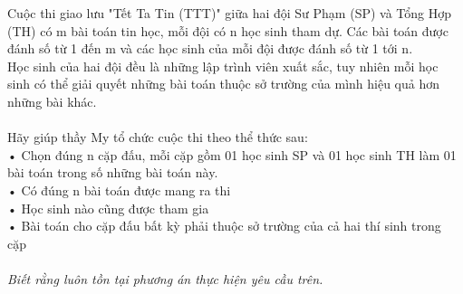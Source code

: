 Cuộc thi giao lưu "Tết Ta Tin (TTT)" giữa hai đội Sư Phạm (SP) và Tổng Hợp (TH) có m bài toán tin học, mỗi đội có n học sinh tham dự. Các bài toán được đánh số từ 1 đến m và các học sinh của mỗi đội được đánh số từ 1 tới n.   
\\   Học sinh của hai đội đều là những lập trình viên xuất sắc, tuy nhiên mỗi học sinh có thể giải quyết những bài toán thuộc sở trường của mình hiệu quả hơn những bài khác.   
\\
\\   Hãy giúp thầy My tổ chức cuộc thi theo thể thức sau:   
\\   • Chọn đúng n cặp đấu, mỗi cặp gồm 01 học sinh SP và 01 học sinh TH làm 01 bài toán trong số những bài toán này.   
\\   • Có đúng n bài toán được mang ra thi   
\\   • Học sinh nào cũng được tham gia   
\\   • Bài toán cho cặp đấu bất kỳ phải thuộc sở trường của cả hai thí sinh trong cặp   
\\
\\\textit{    Biết rằng luôn tồn tại phương án thực hiện yêu cầu trên.   }